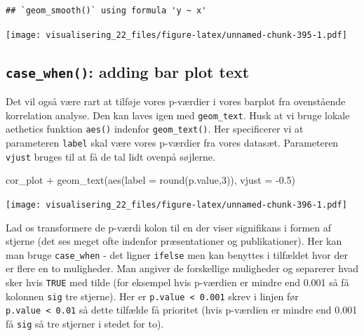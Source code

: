 \documentclass[
]{book}
\newenvironment{Shaded}{\begin{snugshade}}{\end{snugshade}}
\newcommand{\AttributeTok}[1]{\textcolor[rgb]{0.77,0.63,0.00}{#1}}
\newcommand{\DecValTok}[1]{\textcolor[rgb]{0.00,0.00,0.81}{#1}}
\newcommand{\FloatTok}[1]{\textcolor[rgb]{0.00,0.00,0.81}{#1}}
\newcommand{\FunctionTok}[1]{\textcolor[rgb]{0.00,0.00,0.00}{#1}}
\newcommand{\NormalTok}[1]{#1}
\newcommand{\SpecialCharTok}[1]{\textcolor[rgb]{0.00,0.00,0.00}{#1}}
\begin{document}
\begin{verbatim}
## `geom_smooth()` using formula 'y ~ x'
\end{verbatim}

\texttt{[image: visualisering\_22\_files/figure-latex/unnamed-chunk-395-1.pdf]}

\hypertarget{case_when-adding-bar-plot-text}{%
\subsection{\texorpdfstring{\texttt{case\_when()}: adding bar plot text}{case\_when(): adding bar plot text}}\label{case_when-adding-bar-plot-text}}

Det vil også være rart at tilføje vores p-værdier i vores barplot fra ovenstående korrelation analyse. Den kan laves igen med \texttt{geom\_text}. Husk at vi bruge lokale aethetics funktion \texttt{aes()} indenfor \texttt{geom\_text()}. Her specificerer vi at parameteren \texttt{label} skal være vores p-værdier fra vores datasæt. Parameteren \texttt{vjust} bruges til at få de tal lidt ovenpå søjlerne.

\begin{Shaded}
\begin{Highlighting}[]
\NormalTok{cor\_plot }\SpecialCharTok{+} 
  \FunctionTok{geom\_text}\NormalTok{(}\FunctionTok{aes}\NormalTok{(}\AttributeTok{label =} \FunctionTok{round}\NormalTok{(p.value,}\DecValTok{3}\NormalTok{)), }\AttributeTok{vjust =} \SpecialCharTok{{-}}\FloatTok{0.5}\NormalTok{)}
\end{Highlighting}
\end{Shaded}

\texttt{[image: visualisering\_22\_files/figure-latex/unnamed-chunk-396-1.pdf]}

Lad os transformere de p-værdi kolon til en der viser signifikans i formen af stjerne (det ses meget ofte indenfor præsentationer og publikationer). Her kan man bruge \texttt{case\_when} - det ligner \texttt{ifelse} men kan benyttes i tilfældet hvor der er flere en to muligheder. Man angiver de forskellige muligheder og separerer hvad sker hvis \texttt{TRUE} med tilde (for eksempel hvis p-værdien er mindre end 0.001 så få kolonnen \texttt{sig} tre stjerne). Her er \texttt{p.value\ \textless{}\ 0.001} skrev i linjen før \texttt{p.value\ \textless{}\ 0.01} så dette tilfælde få prioritet (hvis p-værdien er mindre end 0.001 få \texttt{sig} så tre stjerner i stedet for to).
\end{document}
